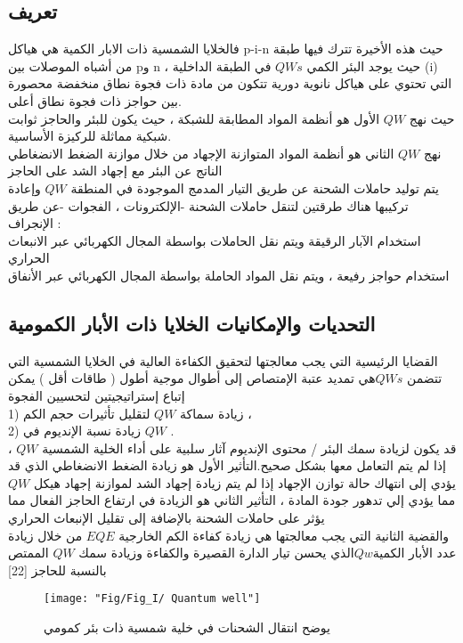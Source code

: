 	\subsection{تعريف}
	فالخلايا الشمسية ذات الابار الكمية هي هياكل p-i-n حيث هذه الأخيرة تترك فيها طبقة من أشباه الموصلات بين pو  n ، حيث يوجد البئر الكمي  $ QWs $ في الطبقة الداخلية (i) التي تحتوي على هياكل نانوية دورية تتكون من مادة ذات فجوة نطاق منخفضة  محصورة بين حواجز ذات فجوة نطاق أعلى. 
	\\
	حيث نهج $ QW $ الأول هو أنظمة المواد المطابقة للشبكة ، حيث يكون للبئر 
	والحاجز ثوابت شبكية مماثلة للركيزة الأساسية.
	\\
	نهج $ QW $ الثاني هو أنظمة المواد المتوازنة الإجهاد  من خلال موازنة الضغط الانضغاطي الناتج عن البئر مع إجهاد الشد على الحاجز
	\\
	يتم توليد حاملات الشحنة عن طريق التيار المدمج الموجودة في المنطقة $ QW $  وإعادة تركيبها هناك طرقتين لتنقل  حاملات الشحنة -الإلكترونات ، الفجوات -عن طريق الإنجراف : 
	\\
	استخدام الآبار الرقيقة ويتم نقل الحاملات  بواسطة المجال الكهربائي عبر الانبعاث الحراري
	\\
	استخدام حواجز رفيعة ، ويتم نقل المواد الحاملة بواسطة المجال الكهربائي عبر الأنفاق
	
	
	
	\subsection{التحديات والإمكانيات الخلايا ذات الأبار الكمومية }
	القضايا الرئيسية التي يجب معالجتها لتحقيق الكفاءة العالية في الخلايا الشمسية التي تتضمن $ QWs  $هي تمديد عتبة الإمتصاص إلى أطوال موجية أطول ( طاقات أقل )  يمكن إتباع إستراتيجيتين لتحسيين الفجوة 
	\\
	1) زيادة سماكة $ QW $ لتقليل تأثيرات حجم الكم ، 
	\\
	2) زيادة نسبة الإنديوم في $ QW $ .
	\\
	قد يكون لزيادة سمك البئر / محتوى الإنديوم آثار سلبية على أداء الخلية الشمسية $ QW $ ، إذا لم يتم التعامل معها بشكل صحيح.التأثير الأول هو زيادة الضغط الانضغاطي الذي قد يؤدي إلى انتهاك حالة توازن الإجهاد إذا لم يتم زيادة إجهاد الشد لموازنة إجهاد هيكل $ QW $ مما يؤدي إلي تدهور جودة المادة ، التأثير الثاني هو الزيادة في ارتفاع الحاجز الفعال مما يؤثر على حاملات الشحنة بالإضافة إلى تقليل الإنبعاث الحراري 
	\\
	والقضية الثانية التي يجب معالجتها  هي زيادة كفاءة الكم الخارجية $ EQE $ من خلال زيادة عدد الأبار الكمية$ Qw  $الذي يحسن تيار الدارة القصيرة والكفاءة وزيادة سمك $ QW $ الممتص بالنسبة للحاجز 
	[22]
	\begin{figure}[h!]
		\centering
		\texttt{[image: "Fig/Fig\_I/ Quantum well"]}
		\caption{يوضح انتقال الشحنات في خلية شمسية ذات بئر كمومي}
		\label{fig:-quantum-well}
	\end{figure}
	
